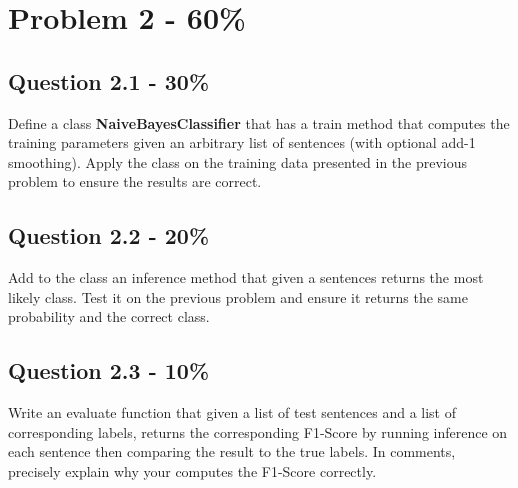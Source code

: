 \documentclass{article}
\begin{document}
\newpage

\section*{Problem 2 - 60\%}

\subsection*{Question 2.1 - 30\%}

Define a class \textbf{NaiveBayesClassifier} that has a train method that computes the training parameters given an arbitrary list of sentences (with optional add-1 smoothing). Apply the class on the training data presented in the previous problem to ensure the results are correct.

\subsection*{Question 2.2 - 20\%}
Add to the class an inference method that given a sentences returns the most likely class. Test it on the previous problem and ensure it returns the same probability and the correct class.

\subsection*{Question 2.3 - 10\%}
Write an evaluate function that given a list of test sentences and a list of corresponding labels, returns the corresponding F1-Score by running inference on each sentence then comparing the result to the true labels. In comments, precisely explain why your computes the F1-Score correctly.
\end{document}
